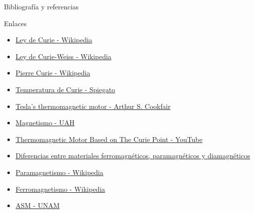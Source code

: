 \documentclass[10pt]{beamer}
\begin{document}
\begin{frame}{Bibliografía y referencias}
    \begin{block}{Enlaces}
        \begin{itemize}
            \item \href{https://es.wikipedia.org/wiki/Ley_de_Curie}{Ley de Curie - Wikipedia}\\
            \item \href{https://es.wikipedia.org/wiki/Ley_de_Curie-Weiss}{Ley de Curie-Weiss - Wikipedia}\\
            \item \href{https://es.wikipedia.org/wiki/Pierre_Curie}{Pierre Curie - Wikipedia}
            \item \href{https://spiegato.com/es/que-es-la-temperatura-de-curie}{Temperatura de Curie - Spiegato}\\
            \item \href{https://teslauniverse.com/build/plans/teslas-thermomagnetic-motor}{Tesla's thermomagnetic motor - Arthur S. Cookfair}\\
            \item \href{https://edejesus.web.uah.es/resumenes/DECI/tema_4.pdf}{Magnetismo - UAH}
            \item \href{https://youtu.be/mjI2AOjIJMs}{Thermomagnetic Motor Based on The Curie Point - YouTube}\\
            \item \href{https://imamagnets.com/blog/diferencias-entre-materiales-ferromagneticos-paramagnetico-y-diamagneticos/}{Diferencias entre materiales ferromagnéticos, paramagnéticos y diamagnéticos}\\
            \item \href{https://es.wikipedia.org/wiki/Paramagnetismo}{Paramagnetismo - Wikipedia}\\
            \item \href{https://es.wikipedia.org/wiki/Ferromagnetismo}{Ferromagnetismo - Wikipedia}
            \item \href{https://app.ingemmet.gob.pe/biblioteca/pdf/LIB-230.pdf}{ASM - UNAM}
        \end{itemize}
    \end{block}
\end{frame}
    
\end{document}
